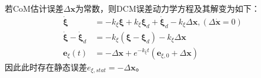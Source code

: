             若CoM估计误差$\varDelta \boldsymbol{x}$为常数，则DCM误差动力学方程及其解变为如下：
            \begin{subequations}
                \begin{align}
                    \boldsymbol{\dot{\xi}}&=-k_{\xi}\boldsymbol{\xi }+k_{\xi}\boldsymbol{\xi }_d+\boldsymbol{\dot{\xi}}_d-k_{\xi}\varDelta \boldsymbol{x},\left( \varDelta \boldsymbol{\dot{x}}=0 \right)
                    \label{equ2-24a}\\
                    \boldsymbol{\dot{\xi}}-\boldsymbol{\dot{\xi}}_d&=-k_{\xi}\left( \boldsymbol{\xi }-\boldsymbol{\xi }_d \right) -k_{\xi}\varDelta \boldsymbol{x}
                    \label{equ2-24b}\\
                    \boldsymbol{e}_{\xi}\left( t \right) &=-\varDelta \boldsymbol{x}+e^{-k_{\xi}t}\left( \boldsymbol{e}_{\xi ,0}+\varDelta \boldsymbol{x} \right)
                    \label{equ2-24c}
                \end{align}
            \end{subequations}
            因此此时存在静态误差$e_{\xi,stat}=-\varDelta \boldsymbol{x}$。
